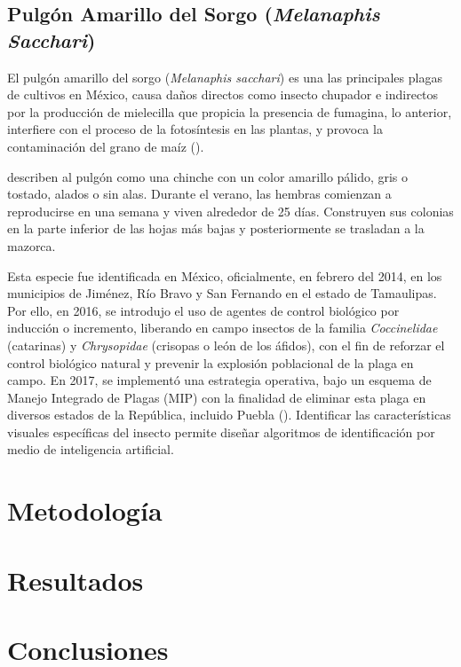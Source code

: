 \documentclass[11pt]{exam}
\begin{document}
        \subsection{Pulg\'on Amarillo del Sorgo (\textit{Melanaphis Sacchari})}\label{sec2.4}
        El pulg\'on amarillo del sorgo (\textit{Melanaphis sacchari}) es una las principales plagas de cultivos en M\'exico, causa daños directos como insecto chupador e indirectos por la producci\'on de mielecilla que propicia la presencia de fumagina, lo anterior, interfiere con el proceso de la fotos\'intesis en las plantas, y provoca la contaminaci\'on del grano de ma\'iz (\cite{pecina-2021}). 

        \cite{hakeem-2019} describen al pulg\'on como una chinche con un color amarillo p\'alido, gris o tostado, alados o sin alas. Durante el verano, las hembras comienzan a reproducirse en una semana y viven alrededor de 25 d\'ias. Construyen sus colonias en la parte inferior de las hojas más bajas y posteriormente se trasladan a la mazorca. 

        Esta especie fue identificada en M\'exico, oficialmente, en febrero del 2014, en los municipios de Jim\'enez, R\'io Bravo y San Fernando en el estado de Tamaulipas. Por ello, en 2016, se introdujo el uso de agentes de control biol\'ogico por inducci\'on o incremento, liberando en campo insectos de la familia \textit{Coccinelidae} (catarinas) y \textit{Chrysopidae} (crisopas o le\'on de los \'afidos), con el fin de reforzar el control biol\'ogico natural y prevenir la explosi\'on poblacional de la plaga en campo. En 2017, se implement\'o una estrategia operativa, bajo un esquema de Manejo Integrado de Plagas (MIP) con la finalidad de eliminar esta plaga en diversos estados de la República, incluido Puebla (\cite{senasica-2018}). Identificar las características visuales específicas del insecto permite diseñar algoritmos de identificación por medio de inteligencia artificial.

    \section{Metodolog\'ia}\label{sec3}

    \section{Resultados}\label{sec4}

    \section{Conclusiones}\label{sec5}

    \printbibliography
\end{document}
